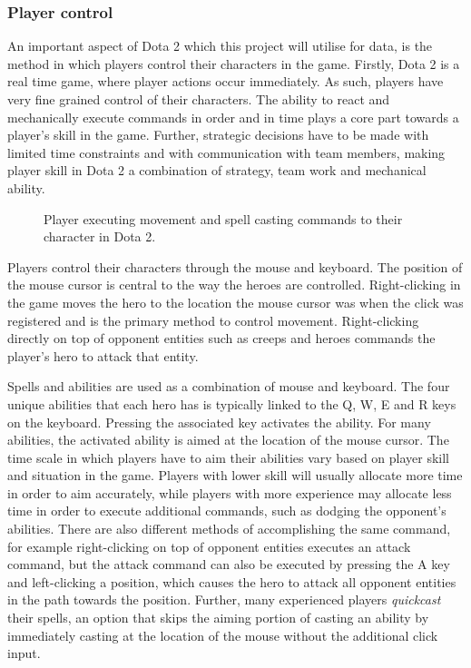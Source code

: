 \documentclass[Report.tex]{subfiles}
\begin{document}
\subsubsection{Player control}\label{sec:dota-control}
An important aspect of Dota 2 which this project will utilise for data, is the method in which players control their characters in the game. Firstly, Dota 2 is a real time game, where player actions occur immediately. As such, players have very fine grained control of their characters. The ability to react and mechanically execute commands in order and in time plays a core part towards a player's skill in the game. Further, strategic decisions have to be made with limited time constraints and with communication with team members, making player skill in Dota 2 a combination of strategy, team work and mechanical ability. 

\begin{figure}[H]
\begin{subfigure}{0.4\textwidth}
\end{subfigure}
\hspace{\fill}
\begin{subfigure}{0.4\textwidth}
\end{subfigure}
\caption{Player executing movement and spell casting commands to their character in Dota 2.}
\end{figure}

Players control their characters through the mouse and keyboard. The position of the mouse cursor is central to the way the heroes are controlled. Right-clicking in the game moves the hero to the location the mouse cursor was when the click was registered and is the primary method to control movement. Right-clicking directly on top of opponent entities such as creeps and heroes commands the player's hero to attack that entity. 

Spells and abilities are used as a combination of mouse and keyboard. The four unique abilities that each hero has is typically linked to the Q, W, E and R keys on the keyboard. Pressing the associated key activates the ability. For many abilities, the activated ability is aimed at the location of the mouse cursor. The time scale in which players have to aim their abilities vary based on player skill and situation in the game. Players with lower skill will usually allocate more time in order to aim accurately, while players with more experience may allocate less time in order to execute additional commands, such as dodging the opponent's abilities. There are also different methods of accomplishing the same command, for example right-clicking on top of opponent entities executes an attack command, but the attack command can also be executed by pressing the A key and left-clicking a position, which causes the hero to attack all opponent entities in the path towards the position. Further, many experienced players \textit{quickcast} their spells, an option that skips the aiming portion of casting an ability by immediately casting at the location of the mouse without the additional click input. 
\end{document}
